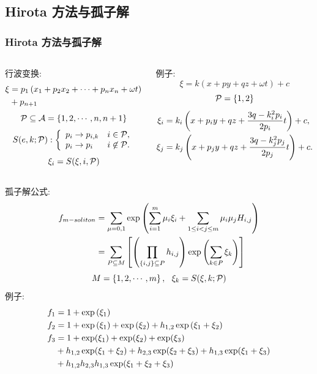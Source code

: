 \subsection{Hirota 方法与孤子解}
\begin{frame}
\frametitle{Hirota 方法与孤子解}
\begin{columns}
\small 
\begin{column}{0.5\textwidth}
行波变换:
\[
\begin{aligned}
    \xi&=p_1\left(x_1+p_2x_2+\cdots+p_nx_n+\omega t\right) \\ 
    &+p_{n+1}
\end{aligned}
\]
\[
    \mathcal{P}\subseteq  \mathcal{A}=\left\{1,2,\cdots,n,n+1\right\}
\]
\[
    S(e,k;\mathcal{P}): \left\{\begin{array}{ll}
        p_i \rightarrow p_{i,k} & i \in \mathcal{P}, \\ 
        p_i \rightarrow p_i & i \not\in \mathcal{P}.
    \end{array}\right.
\]
\[
    \xi_i=S(\xi,i,\mathcal{P})
\]
\end{column}
\begin{column}{0.5\textwidth}
例子:
\[
    \xi=k(x+py+qz+\omega t)+c
\]
\[
    \mathcal{P}=\left\{1,2\right\}
\]
\[
\begin{aligned}
    \xi_i&=k_i\left(x+p_iy+qz+\frac{3q-k_i^2p_i}{2p_i}t\right)+c, \\ 
    \xi_j&=k_j\left(x+p_jy+qz+\frac{3q-k_j^2p_j}{2p_j}t\right)+c.
\end{aligned} 
\]
\end{column}
\end{columns}
\end{frame}

\begin{frame}
孤子解公式:
\[
\begin{aligned}
    f_{m-soliton}&=\sum_{\mu=0,1}\exp\left(\sum_{i=1}^m{\mu_i \xi_i}+\sum_{1\le i<j\le m}{\mu_i\mu_jH_{i,j}}\right) \\ 
    &=\sum_{P\subseteq M}\left[\left(\prod_{\left\{i,j\right\}\subseteq P}{h_{i,j}}\right)\exp\left(\sum_{k\in P}{\xi_k}\right)\right] \\ 
\end{aligned}
\]
\[
    M=\left\{1,2,\cdots,m\right\},~~\xi_k=S(\xi,k;\mathcal{P})
\]
例子:
\[
\begin{aligned}
    f_1&=1+\exp\left(\xi_1\right) \\ 
    f_2&=1+\exp\left(\xi_1\right)+\exp\left(\xi_2\right)+h_{1,2}\exp\left(\xi_1+\xi_2\right) \\ 
    f_3&=1+\exp(\xi_1)+\exp(\xi_2)+\exp(\xi_3)\\
       &+h_{1,2}\exp(\xi_1+\xi_2)+h_{2,3}\exp(\xi_2+\xi_3)+h_{1,3}\exp(\xi_1+\xi_3)\\
       &+h_{1,2}h_{2,3}h_{1,3}\exp(\xi_1+\xi_2+\xi_3)
\end{aligned}
\]
\end{frame}


